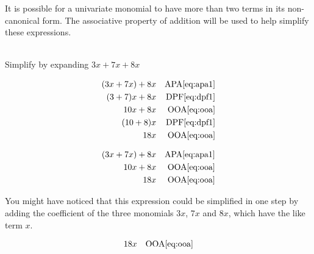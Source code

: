 \documentclass[20150903-160354-rs2.2-MarksMathNotebook.tex]{subfiles}
\begin{document}
It is possible for a univariate monomial to have more than two terms in its non-canonical form.  The associative property of addition will be used to help simplify these expressions.



\begin{example}[id:20141121-184652] \label{20141121-184652} \hfill \\

Simplify by expanding $3x+7x+8x$

\soln
\solnsteps
\begin{align*}
(3x+7x)+8x && \text{APA} \eqref{eq:apa1} \\
(3+7)x+8x && \text{DPF} \eqref{eq:dpf1} \\
10x+8x && \text{OOA} \eqref{eq:ooa} \\
(10+8)x && \text{DPF} \eqref{eq:dpf1} \\
18x && \text{OOA} \eqref{eq:ooa}
\end{align*}

\soln

\lesssteps
\begin{align*}
(3x+7x)+8x && \text{APA} \eqref{eq:apa1} \\
10x+8x && \text{OOA} \eqref{eq:ooa} \\
18x && \text{OOA} \eqref{eq:ooa}
\end{align*}

You might have noticed that this expression could be simplified in one step by adding the coefficient of the three monomials $3x$, $7x$ and $8x$, which have the like term $x$.\\

\soln

\lesssteps
\begin{align*}
18x && \text{OOA} \eqref{eq:ooa}
\end{align*}

\end{example}
\end{document}
